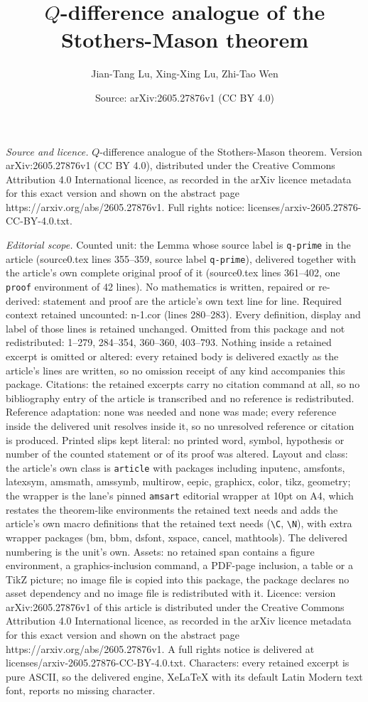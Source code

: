 \documentclass[10pt,a4paper]{amsart}
\title[$Q$-difference analogue of the Stothers-Mason theorem]{$Q$-difference analogue of the Stothers-Mason theorem}
\author{Jian-Tang Lu, Xing-Xing Lu, Zhi-Tao Wen}
\date{Source: arXiv:2605.27876v1 (CC BY 4.0)}
\begin{document}
\maketitle

\noindent\emph{Source and licence.} $Q$-difference analogue of the Stothers-Mason theorem. Version arXiv:2605.27876v1 (CC BY 4.0), distributed under the Creative Commons Attribution 4.0 International licence, as recorded in the arXiv licence metadata for this exact version and shown on the abstract page https://arxiv.org/abs/2605.27876v1. Full rights notice: licenses/arxiv-2605.27876-CC-BY-4.0.txt.\par\smallskip

\noindent\textit{Editorial scope.} Counted unit: the Lemma whose source label is \texttt{q-prime} in the article (source0.tex lines 355--359, source label \texttt{q-prime}), delivered together with the article's own complete original proof of it (source0.tex lines 361--402, one \texttt{proof} environment of 42 lines). No mathematics is written, repaired or re-derived: statement and proof are the article's own text line for line. Required context retained uncounted: n-1.cor (lines 280--283). Every definition, display and label of those lines is retained unchanged. Omitted from this package and not redistributed: 1--279, 284--354, 360--360, 403--793. Nothing inside a retained excerpt is omitted or altered: every retained body is delivered exactly as the article's lines are written, so no omission receipt of any kind accompanies this package. Citations: the retained excerpts carry no citation command at all, so no bibliography entry of the article is transcribed and no reference is redistributed. Reference adaptation: none was needed and none was made; every reference inside the delivered unit resolves inside it, so no unresolved reference or citation is produced. Printed slips kept literal: no printed word, symbol, hypothesis or number of the counted statement or of its proof was altered. Layout and class: the article's own class is \texttt{article} with packages including inputenc, amsfonts, latexsym, amsmath, amssymb, multirow, eepic, graphicx, color, tikz, geometry; the wrapper is the lane's pinned \texttt{amsart} editorial wrapper at 10pt on A4, which restates the theorem-like environments the retained text needs and adds the article's own macro definitions that the retained text needs (\texttt{\textbackslash C}, \texttt{\textbackslash N}), with extra wrapper packages (bm, bbm, dsfont, xspace, cancel, mathtools). The delivered numbering is the unit's own. Assets: no retained span contains a figure environment, a graphics-inclusion command, a PDF-page inclusion, a table or a TikZ picture; no image file is copied into this package, the package declares no asset dependency and no image file is redistributed with it. Licence: version arXiv:2605.27876v1 of this article is distributed under the Creative Commons Attribution 4.0 International licence, as recorded in the arXiv licence metadata for this exact version and shown on the abstract page https://arxiv.org/abs/2605.27876v1. A full rights notice is delivered at licenses/arxiv-2605.27876-CC-BY-4.0.txt. Characters: every retained excerpt is pure ASCII, so the delivered engine, XeLaTeX with its default Latin Modern text font, reports no missing character.
\end{document}

